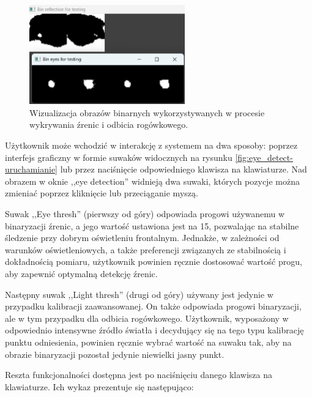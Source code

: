 \documentclass[a4paper,twoside,12pt]{book}
\begin{document}
\begin{figure}[htbp]
	\centering
	\includegraphics[width=0.6\textwidth]{pic/obsługa/okna binarne.png}
	\caption{Wizualizacja obrazów binarnych wykorzystywanych w procesie wykrywania źrenic i odbicia rogówkowego.}
	\label{fig:eye_detect-okna-bin}
\end{figure}

Użytkownik może wchodzić w interakcję z systemem na dwa sposoby: poprzez interfejs graficzny w formie suwaków widocznych na rysunku \ref{fig:eye_detect-uruchamianie} lub przez naciśnięcie odpowiedniego klawisza na klawiaturze. Nad obrazem w oknie ,,eye detection'' widnieją dwa suwaki, których pozycje można zmieniać poprzez kliknięcie lub przeciąganie myszą.

Suwak ,,Eye thresh'' (pierwszy od góry) odpowiada progowi używanemu w binaryzacji źrenic, a jego wartość ustawiona jest na 15, pozwalając na stabilne śledzenie przy dobrym oświetleniu frontalnym. Jednakże, w zależności od warunków oświetleniowych, a także preferencji związanych ze stabilnością i dokładnością pomiaru, użytkownik powinien ręcznie dostosować wartość progu, aby zapewnić optymalną detekcję źrenic.

Następny suwak ,,Light thresh'' (drugi od góry) używany jest jedynie w przypadku kalibracji zaawansowanej. On także odpowiada progowi binaryzacji, ale w tym przypadku dla odbicia rogówkowego. Użytkownik, wyposażony w odpowiednio intensywne źródło światła i decydujący się na tego typu kalibrację punktu odniesienia, powinien ręcznie wybrać wartość na suwaku tak, aby na obrazie binaryzacji pozostał jedynie niewielki jasny punkt.

Reszta funkcjonalności dostępna jest po naciśnięciu danego klawisza na klawiaturze. Ich wykaz prezentuje się następująco:
\end{document}

